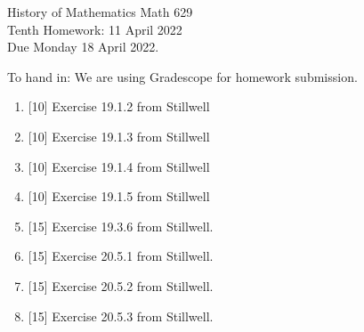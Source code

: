 \documentclass[12pt]{article}
\begin{document}
\LARGE 
\noindent
{\color{Maroon}History of Mathematics \hfill Math 629}\vspace{2pt}\\
\large
Tenth Homework: \hfill 11 April 2022\\
Due Monday 18 April 2022.
\normalsize\vspace{10pt}

To hand in: We are using Gradescope for homework submission.

\begin{enumerate}

\item  {[10]}
     Exercise 19.1.2 from Stillwell 
\item  {[10]}
     Exercise 19.1.3 from Stillwell 
\item  {[10]}
     Exercise 19.1.4 from Stillwell 
\item  {[10]}
     Exercise 19.1.5 from Stillwell 

\item  {[15]}
  Exercise 19.3.6 from Stillwell.

\item  {[15]}
  Exercise 20.5.1 from Stillwell.
\item  {[15]}
  Exercise 20.5.2 from Stillwell.
\item  {[15]}
  Exercise 20.5.3 from Stillwell.

  \end{enumerate}
\end{document}
